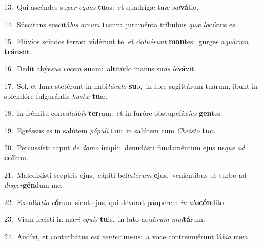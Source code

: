 {\numbfont\textcolor{\numbcolor}{13.}}~Qui ascéndes su\textit{per} \textit{e}\-\textit{quos} \textbf{tu}\-os:~\star et quadrígæ tu\textit{æ} \textit{sal}\-\textbf{vá}tio.\par
{\numbfont\textcolor{\numbcolor}{14.}}~Súscitans suscitá\textit{bis} \textit{ar}\-\textit{cum} \textbf{tu}\-um:~\star juraménta tríbubus \textit{quæ} \textit{lo}\-\textbf{cú}tus es.\par
{\numbfont\textcolor{\numbcolor}{15.}}~Flúvios scindes terræ:~\dagger vidérunt te, et do\-\textit{lu}\-\textit{é}\textit{runt} \textbf{mon}\-tes:~\star gurges a\-\textit{quá}\-\textit{rum} \textbf{tráns}\-iit.\par
{\numbfont\textcolor{\numbcolor}{16.}}~Dedit abýs\textit{sus} \textit{vo}\-\textit{cem} \textbf{su}\-am:~\star altitúdo manus su\textit{as} \textit{le}\-\textbf{vá}vit.\par
{\numbfont\textcolor{\numbcolor}{17.}}~Sol, et luna stetérunt in habi\-\textit{tá}\-\textit{cu}\textit{lo} \textbf{su}\-o,~\star in luce sagittárum tuárum, ibunt in splendóre fulgurántis \textit{has}\-\textit{tæ} \textbf{tu}\-æ.\par
{\numbfont\textcolor{\numbcolor}{18.}}~In frémitu con\-\textit{cul}\-\textit{cá}\textit{bis} \textbf{ter}\-ram:~\star et in furóre obstupefá\-\textit{ci}\-\textit{es} \textbf{gen}\-tes.\par
{\numbfont\textcolor{\numbcolor}{19.}}~Egréssus es in salútem \textit{pó}\-\textit{pu}\textit{li} \textbf{tu}\-i:~\star in salútem cum \textit{Chris}\-\textit{to} \textbf{tu}\-o.\par
{\numbfont\textcolor{\numbcolor}{20.}}~Percussísti caput \textit{de} \textit{do}\-\textit{mo} \textbf{ím}\-\textbf{pi}i:~\star denudásti fundaméntum ejus us\textit{que} \textit{ad} \textbf{col}\-lum.\par
{\numbfont\textcolor{\numbcolor}{21.}}~Maledixísti sceptris ejus,~\dagger cápiti bel\-\textit{la}\-\textit{tó}\textit{rum} \textbf{e}\-jus,~\star veniéntibus ut turbo ad \textit{di}\-\textit{sper}\textbf{gén}dum me.\par
{\numbfont\textcolor{\numbcolor}{22.}}~Exsultá\-\textit{ti}\-\textit{o} \textit{e}\-\textbf{ó}rum~\star sicut ejus, qui dévorat páuperem \textit{in} \textit{abs}\-\textbf{cón}dito.\par
{\numbfont\textcolor{\numbcolor}{23.}}~Viam fecísti in ma\textit{ri} \textit{e}\-\textit{quis} \textbf{tu}\-is,~\star in luto aquá\textit{rum} \textit{mul}\-\textbf{tá}rum.\par
{\numbfont\textcolor{\numbcolor}{24.}}~Audívi, et conturbátus \textit{est} \textit{ven}\-\textit{ter} \textbf{me}\-us:~\star a voce contremuérunt lá\-\textit{bi}\-\textit{a} \textbf{me}\-a.\par
